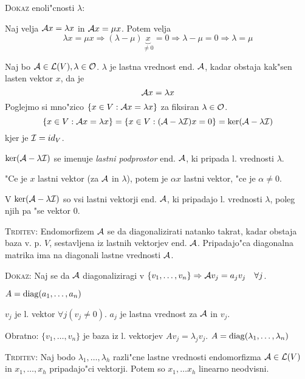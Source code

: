\textsc{Dokaz} enoli"cnosti $\lambda$:

Naj velja $\mathcal{A} x = \lambda x$ in $\mathcal{A} x = \mu x$. Potem velja
\begin{equation*}
\lambda x = \mu x \Rightarrow (\lambda - \mu) \underbrace{x}_{\neq 0} = 0 \Rightarrow \lambda - \mu = 0 \Rightarrow \lambda = \mu
\end{equation*}

Naj bo $\mathcal{A} \in \mathcal{L}(V), \lambda \in \mathcal{O}$. $\lambda$ je lastna vrednost end. $\mathcal{A}$, kadar obstaja kak"sen lasten vektor $x$, da je 
\begin{equation*}
\mathcal{A} x = \lambda x
\end{equation*}
%
Poglejmo si mno"zico $\{x \in V: \mathcal{A} x = \lambda x\}$ za fiksiran $\lambda \in \mathcal{O}$.
\begin{equation*}
\{x \in V: \mathcal{A} x = \lambda x\} = \{x \in V: (\mathcal{A} - \lambda \mathcal{I}) x = 0\} = \ker (\mathcal{A} - \lambda \mathcal{I})
\end{equation*}
kjer je $\mathcal{I} = id_V$.

$\ker (\mathcal{A} - \lambda \mathcal{I})$ se imenuje \emph{lastni podprostor} end. $\mathcal{A}$, ki pripada l. vrednosti $\lambda$.

"Ce je $x$ lastni vektor (za $\mathcal{A}$ in $\lambda$), potem je $\alpha x$ lastni vektor, "ce je $\alpha \neq 0$.

V $\ker (\mathcal{A} - \lambda \mathcal{I})$ so vsi lastni vektorji end. $\mathcal{A}$, ki pripadajo l. vrednosti $\lambda$, poleg njih pa "se vektor 0.

\textsc{Trditev:} Endomorfizem $\mathcal{A}$ se da diagonalizirati natanko takrat, kadar obstaja baza v. p. $V$, sestavljena iz lastnih vektorjev end. $\mathcal{A}$. Pripadajo"ca diagonalna matrika ima na diagonali lastne vrednosti $\mathcal{A}$.

\textsc{Dokaz:} Naj se da $\mathcal{A}$ diagonaliziragi v $\{v_1, \ldots, v_n\} \Rightarrow \mathcal{A} v_j = a_j v_j \quad \forall j$. 

$A = \operatorname{diag} (a_1, \ldots, a_n)$

$v_j$ je l. vektor $\forall j (v_j \neq 0)$. $a_j$ je lastna vrednost za $\mathcal{A}$ in $v_j$.

Obratno: $\{v_1, \ldots, v_n\}$ je baza iz l. vektorjev $Av_j = \lambda_j v_j$. $A = \operatorname{diag} (\lambda_1, \ldots, \lambda_n)$

\textsc{Trditev:} Naj bodo $\lambda_1, \ldots, \lambda_h$ razli"cne lastne vrednosti endomorfizma $\mathcal{A} \in \mathcal{L}(V)$ in $x_1, \ldots, x_h$ pripadajo"ci vektorji. Potem so $x_1, \ldots x_h$ linearno neodvisni.

